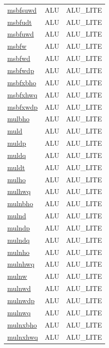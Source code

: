 \begin{small}
\begin{longtable}[l]{l l l}
\hyperlink{lvx.msbfsuwd}{msbfsuwd} & ALU & ALU\_LITE \\ 
\hyperlink{lvx.msbfudt}{msbfudt} & ALU & ALU\_LITE \\ 
\hyperlink{lvx.msbfuwd}{msbfuwd} & ALU & ALU\_LITE \\ 
\hyperlink{lvx.msbfw}{msbfw} & ALU & ALU\_LITE \\ 
\hyperlink{lvx.msbfwd}{msbfwd} & ALU & ALU\_LITE \\ 
\hyperlink{lvx.msbfwdp}{msbfwdp} & ALU & ALU\_LITE \\ 
\hyperlink{lvx.msbfxbho}{msbfxbho} & ALU & ALU\_LITE \\ 
\hyperlink{lvx.msbfxhwq}{msbfxhwq} & ALU & ALU\_LITE \\ 
\hyperlink{lvx.msbfxwdp}{msbfxwdp} & ALU & ALU\_LITE \\ 
\hyperlink{lvx.mulbho}{mulbho} & ALU & ALU\_LITE \\ 
\hyperlink{lvx.muld}{muld} & ALU & ALU\_LITE \\ 
\hyperlink{lvx.muldp}{muldp} & ALU & ALU\_LITE \\ 
\hyperlink{lvx.muldq}{muldq} & ALU & ALU\_LITE \\ 
\hyperlink{lvx.muldt}{muldt} & ALU & ALU\_LITE \\ 
\hyperlink{lvx.mulho}{mulho} & ALU & ALU\_LITE \\ 
\hyperlink{lvx.mulhwq}{mulhwq} & ALU & ALU\_LITE \\ 
\hyperlink{lvx.mulnbho}{mulnbho} & ALU & ALU\_LITE \\ 
\hyperlink{lvx.mulnd}{mulnd} & ALU & ALU\_LITE \\ 
\hyperlink{lvx.mulndp}{mulndp} & ALU & ALU\_LITE \\ 
\hyperlink{lvx.mulndq}{mulndq} & ALU & ALU\_LITE \\ 
\hyperlink{lvx.mulnho}{mulnho} & ALU & ALU\_LITE \\ 
\hyperlink{lvx.mulnhwq}{mulnhwq} & ALU & ALU\_LITE \\ 
\hyperlink{lvx.mulnw}{mulnw} & ALU & ALU\_LITE \\ 
\hyperlink{lvx.mulnwd}{mulnwd} & ALU & ALU\_LITE \\ 
\hyperlink{lvx.mulnwdp}{mulnwdp} & ALU & ALU\_LITE \\ 
\hyperlink{lvx.mulnwq}{mulnwq} & ALU & ALU\_LITE \\ 
\hyperlink{lvx.mulnxbho}{mulnxbho} & ALU & ALU\_LITE \\ 
\hyperlink{lvx.mulnxhwq}{mulnxhwq} & ALU & ALU\_LITE \\ 

\end{longtable}
\end{small}
